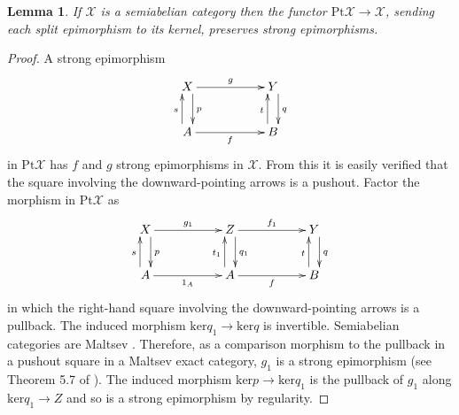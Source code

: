 \documentclass[a4paper,12pt,reqno]{amsart}
\newtheorem{lemma}[theorem]{Lemma}
\theoremstyle{definition}
\theoremstyle{fact}
\theoremstyle{genquest}
\theoremstyle{step}
\newcommand{\ra}{\rightarrow}
\def\CX{{\mathscr X}}
\begin{document}
\begin{lemma}\label{ptpresstepi}
If $\CX$ is a semiabelian category then the functor 
$\mathrm{Pt} \CX\ra \CX$, sending each split epimorphism to its kernel, 
preserves strong epimorphisms.
\end{lemma}
\begin{proof}
A strong epimorphism
\begin{eqnarray*}
\xymatrix{
X \ar[rr]^-{g} \ar@<1ex>[d]^{p} && Y \ar@<1ex>[d]^{q} \\
A\ar@<1ex>[u]^{s} \ar[rr]_-{f} && B\ar@<1ex>[u]^{t}}
\end{eqnarray*}
in $\mathrm{Pt} \CX$ has $f$ and $g$ strong epimorphisms in $\CX$.
From this it is easily verified that the square involving the downward-pointing
arrows is a pushout. 
Factor the morphism in $\mathrm{Pt} \CX$ as 
\begin{eqnarray*}
\xymatrix{
X \ar[rr]^-{g_1} \ar@<1ex>[d]^{p} && Z\ar[rr]^-{f_1} \ar@<1ex>[d]^{q_1} && Y \ar@<1ex>[d]^{q} \\
A\ar@<1ex>[u]^{s} \ar[rr]_-{1_A} && A\ar[rr]_-{f} \ar@<1ex>[u]^{t_1} && B\ar@<1ex>[u]^{t}
}
\end{eqnarray*}
in which the right-hand square involving the downward-pointing arrows is a pullback.
The induced morphism $\mathrm{ker} q_1\ra \mathrm{ker} q$ is invertible.
Semiabelian categories are Maltsev \cite{JMT}. 
Therefore, as a comparison morphism  to
the pullback in a pushout square in a Maltsev exact category, $g_1$ is a strong epimorphism (see Theorem 5.7 of \cite{CKP93}). 
The induced morphism $\mathrm{ker} p\ra \mathrm{ker} q_1$ is the pullback
of $g_1$ along $\mathrm{ker} q_1 \ra Z$ and so is a strong epimorphism by regularity.
\end{proof}
\end{document}

